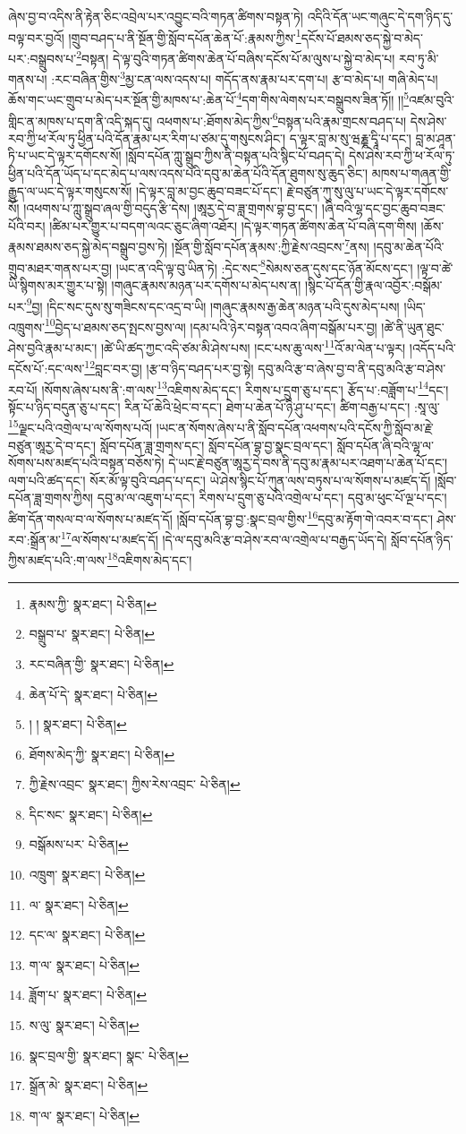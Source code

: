 ཞེས་བྱ་བ་འདིས་ནི་རྟེན་ཅིང་འབྲེལ་པར་འབྱུང་བའི་གཏན་ཚིགས་བསྟན་ཏེ། འདིའི་དོན་ཡང་གཞུང་དེ་དག་ཉིད་དུ་བལྟ་བར་བྱའོ། །གྲུབ་བཤད་པ་ནི་སྔོན་གྱི་སློབ་དཔོན་ཆེན་པོ་:རྣམས་ཀྱིས་\footnote{རྣམས་ཀྱི་  སྣར་ཐང་།  པེ་ཅིན། }དངོས་པོ་ཐམས་ཅད་སྐྱེ་བ་མེད་པར་:བསྒྲུབས་པ་\footnote{བསྒྲུབ་པ་  སྣར་ཐང་།  པེ་ཅིན། }བསྟན། དེ་ལྟ་བུའི་གཏན་ཚིགས་ཆེན་པོ་བཞིས་དངོས་པོ་མ་ལུས་པ་སྐྱེ་བ་མེད་པ། རབ་ཏུ་མི་གནས་པ། :རང་བཞིན་གྱིས་\footnote{རང་བཞིན་གྱི་  སྣར་ཐང་།  པེ་ཅིན། }མྱ་ངན་ལས་འདས་པ། གདོད་ནས་རྣམ་པར་དག་པ། རྩ་བ་མེད་པ། གཞི་མེད་པ། ཆོས་གང་ཡང་གྲུབ་པ་མེད་པར་སྔོན་གྱི་མཁས་པ་:ཆེན་པོ་\footnote{ཆེན་པོ་དེ་  སྣར་ཐང་།  པེ་ཅིན། }དག་གིས་ལེགས་པར་བསྒྲུབས་ཟིན་ཏོ།། །།\footnote{། །  སྣར་ཐང་།  པེ་ཅིན། }འཛམ་བུའི་གླིང་ན་མཁས་པ་དག་ནི་འདི་སྐད་དུ། འཕགས་པ་:ཐོགས་མེད་ཀྱིས་\footnote{ཐོགས་མེད་ཀྱི་  སྣར་ཐང་།  པེ་ཅིན། }བསྟན་པའི་རྣམ་གྲངས་བཤད་པ། དེས་ཤེས་རབ་ཀྱི་ཕ་རོལ་ཏུ་ཕྱིན་པའི་དོན་རྣམ་པར་རིག་པ་ཙམ་དུ་གསུངས་ཤིང་། ད་ལྟར་བླ་མ་སུ་ཝརྞྞ་དྭཱི་པ་དང་། བླ་མ་ཤཱན་ཏི་པ་ཡང་དེ་ལྟར་དགོངས་སོ། །སློབ་དཔོན་ཀླུ་སྒྲུབ་ཀྱིས་ནི་བསྟན་པའི་སྙིང་པོ་བཤད་དེ། དེས་ཤེས་རབ་ཀྱི་ཕ་རོལ་ཏུ་ཕྱིན་པའི་དོན་ཡོད་པ་དང་མེད་པ་ལས་འདས་པའི་དབུ་མ་ཆེན་པོའི་དོན་ཐུགས་སུ་ཆུད་ཅིང་། མཁས་པ་གཞན་གྱི་རྒྱུད་ལ་ཡང་དེ་ལྟར་གསུངས་སོ། །དེ་ལྟར་བླ་མ་བྱང་ཆུབ་བཟང་པོ་དང་། རྗེ་བཙུན་ཀུ་སུ་ལུ་པ་ཡང་དེ་ལྟར་དགོངས་སོ། །འཕགས་པ་ཀླུ་སྒྲུབ་ཞལ་གྱི་བདུད་རྩི་དེས། །ཨཱརྱ་དེ་བ་ཟླ་གྲགས་བྷ་བྱ་དང་། །ཞི་བའི་ལྷ་དང་བྱང་ཆུབ་བཟང་པོའི་བར། །ཚིམ་པར་གྱུར་པ་བདག་ལའང་ཅུང་ཞིག་འཐོར། །དེ་ལྟར་གཏན་ཚིགས་ཆེན་པོ་བཞི་དག་གིས། །ཆོས་རྣམས་ཐམས་ཅད་སྐྱེ་མེད་བསྒྲུབ་བྱས་ཏེ། །སྔོན་གྱི་སློབ་དཔོན་རྣམས་:ཀྱི་རྗེས་འབྲངས་\footnote{ཀྱི་རྗེས་འབྲང་  སྣར་ཐང་། ཀྱིས་རེས་འབྲང་  པེ་ཅིན། }ནས། །དབུ་མ་ཆེན་པོའི་གྲུབ་མཐར་གནས་པར་བྱ། །ཡང་ན་འདི་ལྟ་བུ་ཡིན་ཏེ། :དེང་སང་\footnote{དིང་སང་  སྣར་ཐང་།  པེ་ཅིན། }སེམས་ཅན་དུས་དང་ཉོན་མོངས་དང་། །ལྟ་བ་ཚེ་ཡི་སྙིགས་མར་གྱུར་པ་སྟེ། །གཞུང་རྣམས་མཉན་པར་དགོས་པ་མེད་པས་ན། །སྙིང་པོ་དོན་གྱི་རྣལ་འབྱོར་:བསྒོམ་པར་\footnote{བསྒོམས་པར་  པེ་ཅིན། }བྱ། །དིང་སང་དུས་སུ་གཟིངས་དང་འདྲ་བ་ཡི། །གཞུང་རྣམས་རྒྱ་ཆེན་མཉན་པའི་དུས་མེད་པས། །ཡིད་འཁྲུགས་\footnote{འཁྲུག་  སྣར་ཐང་།  པེ་ཅིན། }བྱེད་པ་ཐམས་ཅད་སྤངས་བྱས་ལ། །དམ་པའི་ཉེར་བསྟན་འབའ་ཞིག་བསྒོམ་པར་བྱ། །ཚེ་ནི་ཡུན་ཐུང་ཤེས་བྱའི་རྣམ་པ་མང་། །ཚེ་ཡི་ཚད་ཀྱང་འདི་ཙམ་མི་ཤེས་པས། །ངང་པས་ཆུ་ལས་\footnote{ལ་  སྣར་ཐང་།  པེ་ཅིན། }འོ་མ་ལེན་པ་ལྟར། །འདོད་པའི་དངོས་པོ་:དང་ལས་\footnote{དང་ལ་  སྣར་ཐང་།  པེ་ཅིན། }བླང་བར་བྱ། །རྩ་བ་ཉིད་བཤད་པར་བྱ་སྟེ། དབུ་མའི་རྩ་བ་ཞེས་བྱ་བ་ནི་དབུ་མའི་རྩ་བ་ཤེས་རབ་པོ། །སོགས་ཞེས་པས་ནི་:ག་ལས་\footnote{ག་ལ་  སྣར་ཐང་།  པེ་ཅིན། }འཇིགས་མེད་དང་། རིགས་པ་དྲུག་ཅུ་པ་དང་། རྩོད་པ་:བཟློག་པ་\footnote{ཟློག་པ་  སྣར་ཐང་།  པེ་ཅིན། }དང་། སྟོང་པ་ཉིད་བདུན་ཅུ་པ་དང་། རིན་པོ་ཆེའི་ཕྲེང་བ་དང་། ཐེག་པ་ཆེན་པོ་ཉི་ཤུ་པ་དང་། ཚིག་བརྒྱ་པ་དང་། :སཱ་ལུ་\footnote{ས་ལུ་  སྣར་ཐང་།  པེ་ཅིན། }ལྗང་པའི་འགྲེལ་པ་ལ་སོགས་པའོ། །ཡང་ན་སོགས་ཞེས་པ་ནི་སློབ་དཔོན་འཕགས་པའི་དངོས་ཀྱི་སློབ་མ་རྗེ་བཙུན་ཨཱརྱ་དེ་བ་དང་། སློབ་དཔོན་ཟླ་གྲགས་དང་། སློབ་དཔོན་བྷ་བྱ་སྣང་བྲལ་དང་། སློབ་དཔོན་ཞི་བའི་ལྷ་ལ་སོགས་པས་མཛད་པའི་བསྟན་བཅོས་ཏེ། དེ་ཡང་རྗེ་བཙུན་ཨཱརྱ་དེ་བས་ནི་དབུ་མ་རྣམ་པར་འཐག་པ་ཆེན་པོ་དང་། ལག་པའི་ཚད་དང་། སོར་མོ་ལྟ་བུའི་བཤད་པ་དང་། ཡེ་ཤེས་སྙིང་པོ་ཀུན་ལས་བཏུས་པ་ལ་སོགས་པ་མཛད་དོ། །སློབ་དཔོན་ཟླ་གྲགས་ཀྱིས། དབུ་མ་ལ་འཇུག་པ་དང་། རིགས་པ་དྲུག་ཅུ་པའི་འགྲེལ་པ་དང་། དབུ་མ་ཕུང་པོ་ལྔ་པ་དང་། ཚིག་དོན་གསལ་བ་ལ་སོགས་པ་མཛད་དོ། །སློབ་དཔོན་བྷ་བྱ་:སྣང་བྲལ་གྱིས་\footnote{སྣང་བྲལ་གྱི་  སྣར་ཐང་། སྣང་  པེ་ཅིན། }དབུ་མ་རྟོག་གེ་འབར་བ་དང་། ཤེས་རབ་:སྒྲོན་མ་\footnote{སྒྲོན་མེ་  སྣར་ཐང་།  པེ་ཅིན། }ལ་སོགས་པ་མཛད་དོ། །དེ་ལ་དབུ་མའི་རྩ་བ་ཤེས་རབ་ལ་འགྲེལ་པ་བརྒྱད་ཡོད་དེ། སློབ་དཔོན་ཉིད་ཀྱིས་མཛད་པའི་:ག་ལས་\footnote{ག་ལ་  སྣར་ཐང་།  པེ་ཅིན། }འཇིགས་མེད་དང་། 